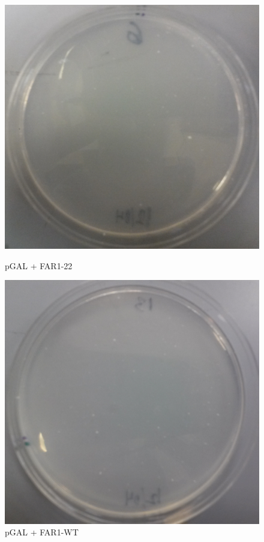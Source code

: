 \documentclass{beamer}
\begin{document}
\begin{frame}
    \begin{minipage}[ht!]{.48\textwidth}
          \begin{figure}[ht!]
            \centering
            \includegraphics[width=.9\textwidth]{HRecomb1.png}
            \label{fig:pc2r}
            \caption{pGAL + FAR1-22}
        \end{figure}
    \end{minipage}
    \hfill
    \begin{minipage}[ht!]{.48\textwidth}
         \begin{figure}[ht!]
            \centering
            \includegraphics[width=.9\textwidth]{HRecomb2.png}
            \caption{pGAL + FAR1-WT}
            \label{fig:pc3r}
        \end{figure}
    \end{minipage}
\end{frame}
\end{document}
